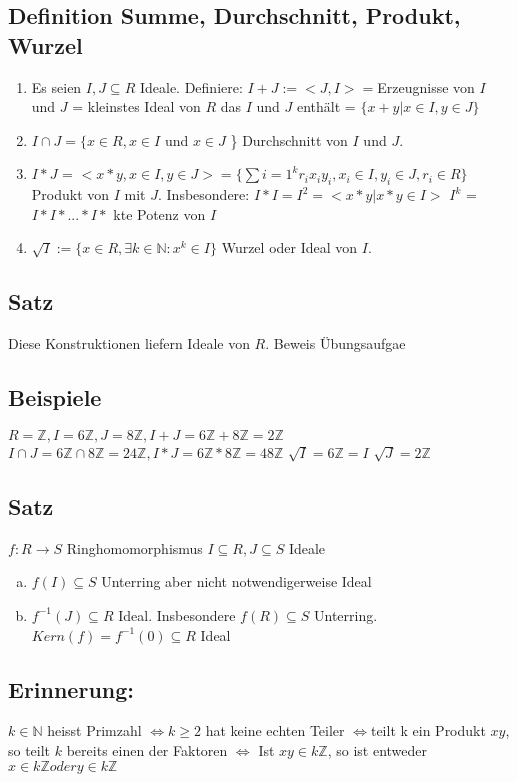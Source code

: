 \documentclass[12pt,a4paper,ngerman]{scrreprt}
\begin{document}
\subsection{Definition Summe, Durchschnitt, Produkt, Wurzel}
\begin{enumerate}[]
\item Es seien $I,J \subseteq R$ Ideale. Definiere: $I+J := <J,I> = $Erzeugnisse von $I$ und $J$ = kleinstes Ideal von $R$ das $I$ und $J$ enthält
= $\{x+y | x \in I, y \in J\}$
\item $I \cap J = \{x \in R, x \in I$ und $x \in J$ \} Durchschnitt von $I$ und $J$.
\item $I*J$ = $<x*y, x\in I, y \in J> = \{\sum{i=1}^k r_ix_iy_i, x_i \in I, y_i \in J, r_i \in R\}$
Produkt von $I$ mit $J$. Insbesondere: $I*I = I^2 = <x*y | x*y\in I>$
$I^k$ = $I*I*...*I*$ kte Potenz von $I$
\item $\sqrt{I} :=\{x\in R, \exists k\in \mathbb{N}: x^k \in I\}$ Wurzel oder Ideal von $I$.
\end{enumerate}

\subsection{Satz}
Diese Konstruktionen liefern Ideale von $R$. Beweis Übungsaufgae
\subsection{Beispiele}
$R = \mathbb{Z}, I = 6\mathbb{Z}, J = 8\mathbb{Z}, I+J = 6\mathbb{Z} + 8\mathbb{Z} = 2 \mathbb{Z}$
$I \cap J = 6\mathbb{Z} \cap 8\mathbb{Z} = 24 \mathbb{Z}, I*J = 6\mathbb{Z}*8\mathbb{Z} = 48\mathbb{Z}$
$\sqrt{I} = 6\mathbb{Z} = I$ $\sqrt{J} = 2\mathbb{Z}$

\subsection{Satz}
$f: R\to S$ Ringhomomorphismus $I \subseteq R, J \subseteq S $ Ideale
\begin{enumerate}[(a)]
\item $f(I) \subseteq S$ Unterring aber nicht notwendigerweise Ideal
\item $f^{-1}(J) \subseteq R $ Ideal. Insbesondere $f(R) \subseteq S$ Unterring. $Kern(f) = f^{-1}(0) \subseteq R$ Ideal
\end{enumerate}

\subsection{Erinnerung:}
$k \in \mathbb{N}$ heisst Primzahl $\Leftrightarrow k \geq 2$ hat keine echten Teiler 
$\Leftrightarrow $teilt k ein Produkt $xy$, so teilt $k$ bereits einen der Faktoren 
$\Leftrightarrow$ Ist $xy \in k \mathbb{Z}$, so ist entweder $x \in k \mathbb{Z} oder y \in k \mathbb{Z}$
\end{document}
